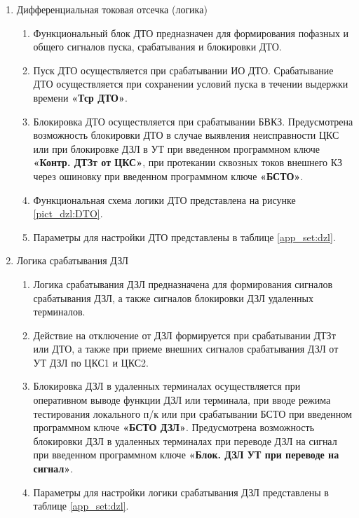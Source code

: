 \begin{enumerate}
\item Дифференциальная токовая отсечка (логика)
\begin{enumerate}
\item Функциональный блок ДТО предназначен для формирования пофазных и общего сигналов пуска, срабатывания и блокировки ДТО.
\item Пуск ДТО осуществляется при срабатывании ИО ДТО. Срабатывание ДТО осуществляется при сохранении условий пуска в течении выдержки времени \textbf{«Тср ДТО»}.
\item Блокировка ДТО осуществляется при срабатывании БВКЗ. Предусмотрена возможность блокировки ДТО в случае выявления неисправности ЦКС или при блокировке ДЗЛ в УТ при введенном программном ключе \textbf{«Контр. ДТЗт от ЦКС»}, при протекании сквозных токов внешнего КЗ через ошиновку при введенном программном ключе \textbf{«БСТО»}.
\item Функциональная схема логики ДТО представлена на рисунке \ref{pict_dzl:DTO}.
\item Параметры для настройки ДТО представлены в таблице \ref{app_set:dzl}.
\end{enumerate}

\item Логика срабатывания ДЗЛ
\begin{enumerate}
\item Логика срабатывания ДЗЛ предназначена для формирования сигналов срабатывания ДЗЛ, а также сигналов блокировки ДЗЛ удаленных терминалов.
\item Действие на отключение от ДЗЛ формируется при срабатывании ДТЗт или ДТО, а также при приеме внешних сигналов срабатывания ДЗЛ от УТ ДЗЛ по ЦКС1 и ЦКС2.
\item Блокировка ДЗЛ в удаленных терминалах осуществляется при оперативном выводе функции ДЗЛ или терминала, при вводе режима тестирования локального п/к или при срабатывании БСТО при введенном программном ключе \textbf{«БСТО ДЗЛ»}. Предусмотрена возможность блокировки ДЗЛ в удаленных терминалах при переводе ДЗЛ на сигнал при введенном программном ключе \textbf{«Блок. ДЗЛ УТ при переводе на сигнал»}.
\item Параметры для настройки логики срабатывания ДЗЛ представлены в таблице \ref{app_set:dzl}.
\end{enumerate}


\end{enumerate}
